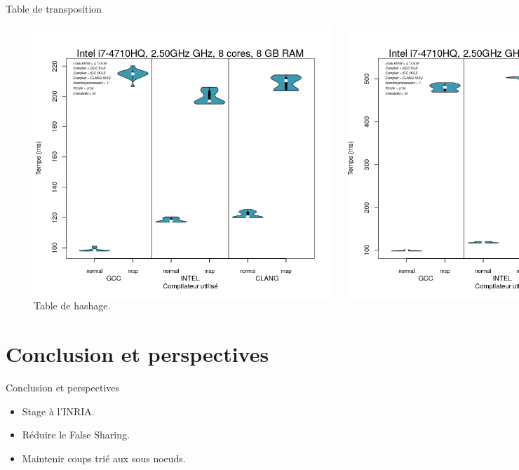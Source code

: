\documentclass{beamer}
\begin{document}
\begin{frame}{Table de transposition}
	\begin{figure}
	\begin{columns}
      \includegraphics[width=\textwidth]{sorted_map.png}
      \caption{Arbre binaire de recherche.\label{Fig:arbre_binaire}}
      \includegraphics[width=\textwidth]{unsorted_map.png}
      \caption{Table de hashage.\label{Fig:arbre_binaire}}
    \end{columns}	
	\end{figure}
\end{frame}

\section{Conclusion et perspectives}

\begin{frame}{Conclusion et perspectives}
\begin{itemize}
  \item
  	Stage à l'\textsc{INRIA}.
  \item
    Réduire le False Sharing.
  \item
  	Maintenir coups trié aux sous noeuds.
 \end{itemize}	
\end{frame}
\end{document}
